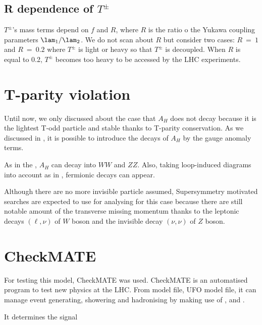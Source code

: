 \subsection{R dependence of $T^\pm$}
$T^\pm$'s mass terms  depend on $f$ and $R$, where $R$ is the ratio o the Yukawa coupling parameters $\lam_1/\lam_2$.
We do not scan about $R$ but consider two cases: $R~=~1$ and $R~=~0.2$ where $T^\pm$ is light or heavy so that $T^\pm$ is decoupled. 
When $R$ is equal to 0.2, $T^\pm$ becomes too heavy to be accessed by the LHC experiments.


\section{T-parity violation}
Until now, we only discussed about the case that $A_H$ does not decay because it is the lightest T-odd particle and stable thanks to T-parity conservation. 
As we discussed in ,
it is possible to introduce the decays of $A_H$ by the gauge anomaly terms. 

As in the , $A_H$ can decay into $WW$ and $ZZ$. 
Also, taking loop-induced diagrams into account as in , fermionic decays can appear. 


Although there are no more invisible particle assumed,
Supersymmetry motivated searches are expected to use for analysing for this case
because there are still notable amount of the transverse missing momentum thanks to 
the leptonic decays $(\ell,\nu)$ of $W$ boson and the invisible decay $(\nu,\nu)$ of $Z$ boson.



\section{CheckMATE}
For testing this model, CheckMATE was used.
CheckMATE is an automatised program to test new physics at the LHC.
From \Feynrules model file, UFO model file, 
it can manage event generating, showering and hadronising by making use of \Madgraph, 
\Pythia and \Delphes. 

It determines the signal



